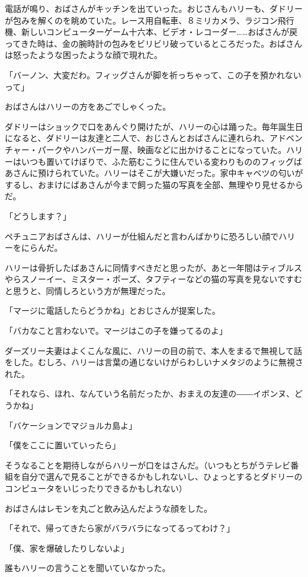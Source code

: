 \documentclass[10pt,a4paper]{article}
\begin{document}
\begin{CJK}{UTF8}{min}
電話が鳴り、おばさんがキッチンを出ていった。おじさんもハリーも、ダドリーが包みを解くのを眺めていた。レース用自転車、８ミリカメラ、ラジコン飛行機、新しいコンピューターゲーム十六本、ビデオ・レコーダー……おばさんが戻ってきた時は、金の腕時計の包みをビリビリ破っているところだった。おばさんは怒ったような困ったような顔で現れた。

「バーノン、大変だわ。フィッグさんが脚を祈っちゃって、この子を預かれないって」

おばさんはハリーの方をあごでしゃくった。

ダドリーはショックで口をあんぐり開けたが、ハリーの心は踊った。毎年誕生日になると、ダドリーは友達と二人で、おじさんとおばさんに連れられ、アドベンチャー・パークやハンバーガー屋、映画などに出かけることになっていた。ハリーはいつも置いてけぼりで、ふた筋むこうに住んでいる変わりもののフィッグばあさんに預けられていた。ハリーはそこが大嫌いだった。家中キャベツの匂いがするし、おまけにばあさんが今まで飼った猫の写真を全部、無理やり見せるからだ。

「どうします？」

ペチュニアおばさんは、ハリーが仕組んだと言わんばかりに恐ろしい顔でハリーをにらんだ。

ハリーは骨折したばあさんに同情すべきだと思ったが、あと一年間はティブルスやらスノーイー、ミスター・ポーズ、タフティーなどの猫の写真を見ないですむと思うと、同情しろという方が無理だった。

「マージに電話したらどうかね」とおじさんが提案した。

「バカなこと言わないで。マージはこの子を嫌ってるのよ」

ダーズリー夫妻はよくこんな風に、ハリーの目の前で、本人をまるで無視して話をした。むしろ、ハリーは言葉の通じないけがらわしいナメタジのように無視された。

「それなら、ほれ、なんていう名前だったか、おまえの友達の――イボンヌ、どうかね」

「バケーションでマジョルカ島よ」

「僕をここに置いていったら」

そうなることを期待しながらハリーが口をはさんだ。（いつもとちがうテレビ番組を自分で選んで見ることができるかもしれないし、ひょっとするとダドリーのコンピュータをいじったりできるかもしれない）

おばさんはレモンを丸ごと飲み込んだような顔をした。

「それで、帰ってきたら家がバラバラになってるってわけ？」

「僕、家を爆破したりしないよ」

誰もハリーの言うことを聞いていなかった。


\end{CJK}
\end{document}
